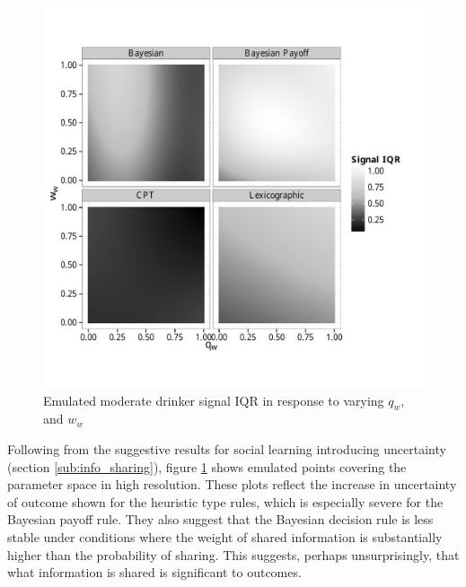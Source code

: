 \begin{figure}[H]
\begin{adjustbox}{center}\includegraphics[width=119mm]{figures/unfixed_emu_sig_iqr}\end{adjustbox}
\caption{Emulated moderate drinker signal IQR in response to varying \(q_{w}\), and \(w_{w}\)}
\label{fig:emulated_sharing_iqr}
\end{figure}

Following from the suggestive results for social learning introducing uncertainty (section \ref{sub:info_sharing}), figure \ref{fig:emulated_sharing_iqr} shows emulated points covering the parameter space in high resolution. These plots reflect the increase in uncertainty of outcome shown for the heuristic type rules, which is especially severe for the Bayesian payoff rule. They also suggest that the Bayesian decision rule is less stable under conditions where the weight of shared information is substantially higher than the probability of sharing. This suggests, perhaps unsurprisingly, that what information is shared is significant to outcomes.

